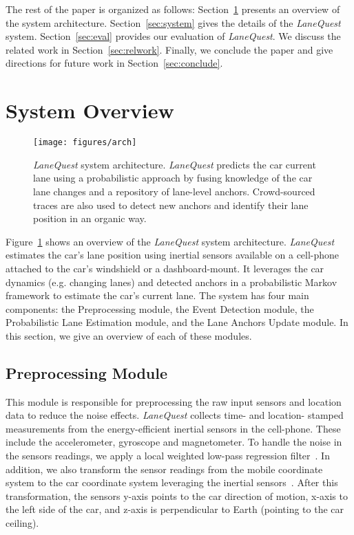 \documentclass[10pt, conference, compsocconf]{IEEEtran}
\def \sys {\textit{LaneQuest}}
\begin{document}
The rest of the paper is organized as follows: Section~\ref{sec:sys_overview} presents an overview of the system architecture. Section~\ref{sec:system} gives the details of the \sys{} system.  Section~\ref{sec:eval} provides our evaluation of \sys{}. We discuss the related work in Section~\ref{sec:relwork}. Finally, we conclude the paper and give directions for future work in Section~\ref{sec:conclude}.
\section{System Overview}\label{sec:sys_overview} \begin{figure}[!t]
\centering
\texttt{[image: figures/arch]}
\caption{\sys{} system architecture. \sys{} predicts the car current lane using a probabilistic approach by fusing knowledge of the car lane changes and a repository of lane-level anchors. Crowd-sourced traces are also used to detect new anchors and identify their lane position in an organic way.}
\label{fig:o_arch}
\end{figure}
Figure~\ref{fig:o_arch} shows an overview of the \sys{} system architecture. \sys{} estimates the car's lane position using inertial sensors available on a cell-phone attached to the car's windshield or a dashboard-mount. It leverages the car dynamics (e.g. changing lanes) and detected anchors in a probabilistic Markov framework to estimate the car's current lane. The system has four main components: the Preprocessing module, the Event Detection module, the Probabilistic Lane Estimation module, and the Lane Anchors Update module.
In this section, we give an overview of each of these modules.
\subsection{Preprocessing Module}

This module is responsible for preprocessing the raw input sensors and location data to reduce the noise effects. \sys{} collects time- and location- stamped measurements from the energy-efficient inertial sensors in the cell-phone. These include the accelerometer, gyroscope and magnetometer. To handle the noise in the sensors readings, we apply a local weighted low-pass regression filter~\cite{aly2013dejavu}. In addition, we also transform the sensor readings from the mobile coordinate system to the car coordinate system leveraging the inertial sensors~\cite{wang2013sensing,mohssen2014s}. After this transformation, the sensors y-axis points to the car direction of motion, x-axis to the left side of the car, and z-axis is perpendicular to Earth (pointing to the car ceiling).
\end{document}
